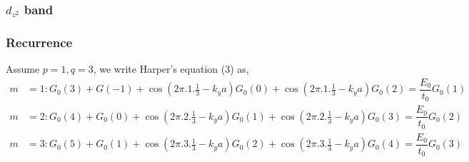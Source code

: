 \documentclass{report}
\newcommand{\f}[2]{\dfrac{#1}{#2}}
\begin{document}
\subsubsection*{$d_{z^2}$ band}
\subsubsection*{Recurrence}
Assume $p = 1, q = 3$, we write Harper's equation (3) as,
\begin{align*}
	m & = 1: G_{0}(3) + G(-1) + \cos\left( 2\pi.1.\frac{1}{3} - k_ya \right) G_{0}(0) + \cos\left( 2\pi.1.\frac{1}{3} - k_ya \right) G_{0}(2) =\f{E_{0}}{t_0} G_{0}(1)    \\
	m & = 2: G_{0}(4) + G_{0}(0) + \cos\left( 2\pi.2.\frac{1}{3} - k_ya \right) G_{0}(1) + \cos\left( 2\pi.2.\frac{1}{3} - k_ya \right) G_{0}(3) =\f{E_{0}}{t_0} G_{0}(2) \\
	m & = 3: G_{0}(5) + G_{0}(1) + \cos\left( 2\pi.3.\frac{1}{3} - k_ya \right) G_{0}(2) + \cos\left( 2\pi.3.\frac{1}{3} - k_ya \right) G_{0}(4) =\f{E_{0}}{t_0} G_{0}(3)
\end{align*}
\end{document}
